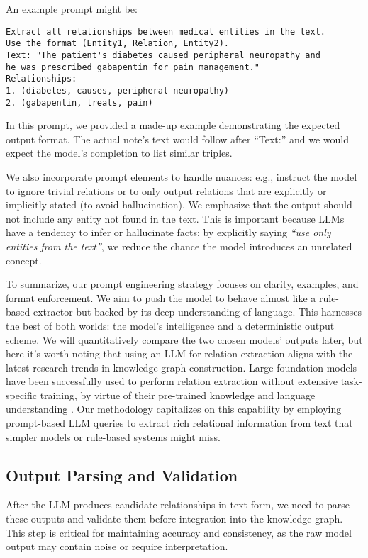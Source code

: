 An example prompt might be:

\begin{verbatim}
Extract all relationships between medical entities in the text. 
Use the format (Entity1, Relation, Entity2).
Text: "The patient's diabetes caused peripheral neuropathy and 
he was prescribed gabapentin for pain management."
Relationships:
1. (diabetes, causes, peripheral neuropathy)
2. (gabapentin, treats, pain)
\end{verbatim}

In this prompt, we provided a made-up example demonstrating the expected output format. The actual note's text would follow after ``Text:'' and we would expect the model's completion to list similar triples.

We also incorporate prompt elements to handle nuances: e.g., instruct the model to ignore trivial relations or to only output relations that are explicitly or implicitly stated (to avoid hallucination). We emphasize that the output should not include any entity not found in the text. This is important because LLMs have a tendency to infer or hallucinate facts; by explicitly saying \textit{``use only entities from the text''}, we reduce the chance the model introduces an unrelated concept.

To summarize, our prompt engineering strategy focuses on clarity, examples, and format enforcement. We aim to push the model to behave almost like a rule-based extractor but backed by its deep understanding of language. This harnesses the best of both worlds: the model's intelligence and a deterministic output scheme. We will quantitatively compare the two chosen models' outputs later, but here it's worth noting that using an LLM for relation extraction aligns with the latest research trends in knowledge graph construction. Large foundation models have been successfully used to perform relation extraction without extensive task-specific training, by virtue of their pre-trained knowledge and language understanding \parencite{Singhal2022}. Our methodology capitalizes on this capability by employing prompt-based LLM queries to extract rich relational information from text that simpler models or rule-based systems might miss.

\subsection{Output Parsing and Validation}
\label{sec:outputparsing}

After the LLM produces candidate relationships in text form, we need to parse these outputs and validate them before integration into the knowledge graph. This step is critical for maintaining accuracy and consistency, as the raw model output may contain noise or require interpretation.

